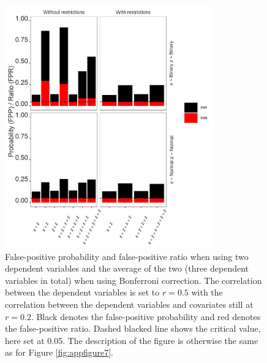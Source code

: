 \begin{figure}[ht!]
\includegraphics[width=0.8\textwidth]{R/Analysis/Result/Figures/Figure3SIBon.jpeg}
\centering
\caption{False-positive probability and false-positive ratio when using two dependent variables and the average of the two (three dependent variables in total) when using Bonferroni correction. The correlation between the dependent variables is set to  $\textit{r}=0.5$ with the correlation between the dependent variables and covariates still at  $\textit{r}=0.2$. Black denotes the false-positive probability and red denotes the false-positive ratio. Dashed blacked line shows the critical value, here set at 0.05. The description of the figure is otherwise the same as for Figure \ref{fig:appfigure7}.}
\label{fig:appfigure9}
\end{figure}


